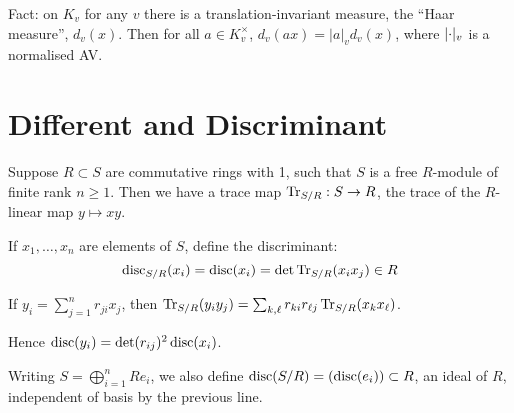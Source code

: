 \documentclass[10pt,a4paper]{article}
\begin{document}
Fact: on $K_v$ for any $v$ there is a translation-invariant measure, the ``Haar measure'', $d_v(x)$. Then for all $a \in K_v^\times$, $d_v(ax) = |a|_v d_v(x)$, where $\lvert\cdot\rvert_v$ is a normalised AV.

\section{Different and Discriminant}
Suppose $R \subset S$ are commutative rings with 1, such that $S$ is a free $R$-module of finite rank $n \geq 1$. Then we have a trace map $\operatorname{Tr}_{S/R}:S \to R$, the trace of the $R$-linear map $y \mapsto xy$.

If $x_1, \ldots, x_n$ are elements of $S$, define the discriminant:
\[\operatorname{disc}_{S/R}(x_i) = \operatorname{disc}(x_i) = \det \operatorname{Tr}_{S/R} (x_ix_j) \in R\]

If $y_i = \sum_{j=1}^n r_{ji}x_j$, then $\operatorname{Tr}_{S/R}(y_iy_j) = \sum_{k,\ell} r_{ki}r_{\ell j}\operatorname{Tr}_{S/R}(x_kx_\ell)$.

Hence $\operatorname{disc}(y_i) = \det(r_{ij})^2 \operatorname{disc}(x_i)$.

Writing $S = \bigoplus_{i=1}^n Re_i$, we also define $\operatorname{disc}(S/R) = (\operatorname{disc}(e_i)) \subset R$, an ideal of $R$, independent of basis by the previous line.
\end{document}

